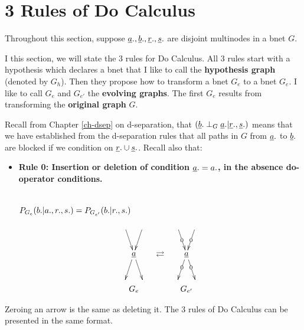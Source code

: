 \section{3 Rules of Do Calculus}
Throughout
this section, suppose
$\rva., \rvb., \rvr.,
\rvs.$ are disjoint
multinodes in a bnet $G$.

I this section, we will state
the 3 rules for Do Calculus. All 3 rules start with a hypothesis
which declares a bnet that I like to call the {\bf hypothesis graph} (denoted by $G_h$). Then they propose how
to transform a bnet $G_e$ to a bnet $G_e$. I like to call 
$G_e$ and $G_{e'}$ the {\bf evolving graphs}. The first $G_e$ 
results from transforming the {\bf original graph} $G$.


Recall
from Chapter \ref{ch-dsep}
on d-separation,
that  $(\rvb.\perp_G \rva.|\rvr., \rvs.)$
means that
we have established
from the d-separation
rules that
all
paths in $G$
 from
$\rva.$ to
$\rvb.$
are blocked
if we condition
on $\rvr.\cup \rvs.$.
Recall also that:

\begin{itemize}
\item {\bf Rule 0: Insertion or
 deletion of condition $\rva.=a.$, in the absence
do-operator conditions.}

\\
$P_{G_e}(b.|a.,r.,s.)=P_{G_{e'}}(b.|r., s.)$
\\
$$%
\begin{array}{ccc}
\xymatrix@C=.2pc{
\ar[dr]
&&\ar[dl]
\\
&\rva
\ar[dr]
\ar[dl]
\\
&&
}
&
\xymatrix{\\
\rightleftarrows
}
&
\xymatrix@C=.2pc{
\ar[dr]|0
&&\ar[dl]|0
\\
&\rva
\ar[dr]|0
\ar[dl]|0
\\
&&
}
\\
G_e&&G_{e'}
\end{array}
$$

\end{itemize}
Zeroing an arrow is the same as deleting it.
The 3 rules of Do Calculus
can be presented in the same
format.


